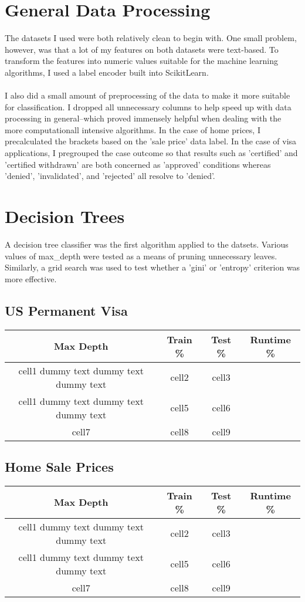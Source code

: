 \documentclass[h]{article}
\begin{document}
  \section*{General Data Processing}
  The datasets I used were both relatively clean to begin with.  One small 
  problem, however, was that a lot of my features on both datasets were 
  text-based.  To transform the features into numeric values suitable for the 
  machine learning algorithms, I used a label encoder built into ScikitLearn.
  \\ \\
  I also did a small amount of preprocessing of the data to make it more 
  suitable for classification.  I dropped all unnecessary columns to help 
  speed up with data processing in general--which proved immensely helpful when 
  dealing with the more computationall intensive algorithms.  In the 
  case of home prices, I precalculated the brackets based on the 'sale price' data label.  
  In the case of visa applications, I pregrouped the case outcome so that 
  results such as 'certified' and 'certified withdrawn' are both concerned as 
  'approved' conditions whereas 'denied', 'invalidated', and 'rejected' all 
  resolve to 'denied'.
  
 \section*{Decision Trees}
 A decision tree classifier was the first algorithm applied to the datsets.  
 Various values of max\_depth were tested as a means of pruning unnecessary 
 leaves.  Similarly, a grid search was used to test whether a 'gini' or 
 'entropy' criterion was more effective.

\subsection*{US Permanent Visa}
\begin{tabular}{ | c | c | c | c | } 
\hline
\textbf{Max Depth} & \textbf{Train \%} & \textbf{Test \%} & \textbf{Runtime} \%} \\
\hline
cell1 dummy text dummy text dummy text& cell2 & cell3 \\ 
\hline
cell1 dummy text dummy text dummy text & cell5 & cell6 \\ 
\hline
cell7 & cell8 & cell9 \\ 
\hline
\end{tabular}

\subsection*{Home Sale Prices}
\begin{tabular}{ | c | c | c | c | } 
\hline
\textbf{Max Depth} & \textbf{Train \%} & \textbf{Test \%} & \textbf{Runtime} \%} \\
\hline
cell1 dummy text dummy text dummy text& cell2 & cell3 \\ 
\hline
cell1 dummy text dummy text dummy text & cell5 & cell6 \\ 
\hline
cell7 & cell8 & cell9 \\ 
\hline
\end{tabular}
\end{document}
